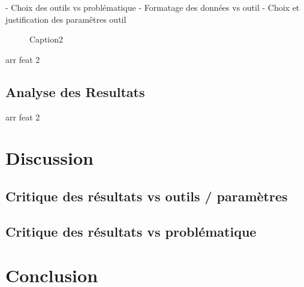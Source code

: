 \documentclass[12pt]{article}
\begin{document}
- Choix des outils vs problématique  
- Formatage des données vs outil  
- Choix et justification des paramêtres outil  

\blindtext[3]

\begin{figure}
     
    \caption{Caption2}
    \label{fig:wrapfig}
\end{figure}

\begin{table}
    
    \caption{arr feat 2}
    \label{tab:arrft2}

\end{table}


\begin{landscape}

    \section{Analyse des Resultats}

    \blindtext[6]
    \begin{table}
        \let\center\empty
        \let\endcenter\relax
        \centering
        \resizebox{.6\width}{!}{}
    \end{table} 

    \begin{table}
        
        \caption{arr feat 2}
        \label{tab:arrft1}
    \end{table} 


\end{landscape}



\section{Discussion}
\subsection{Critique des résultats vs outils / paramètres}
\subsection{Critique des résultats vs problématique}
\blindtext[3]
\section{Conclusion}
\blindtext[1]

\setcounter{biburlnumpenalty}{7000}
\setcounter{biburllcpenalty}{7000}
\setcounter{biburlucpenalty}{7000}

\printbibliography[heading=bibintoc,title=References]
\end{document}

